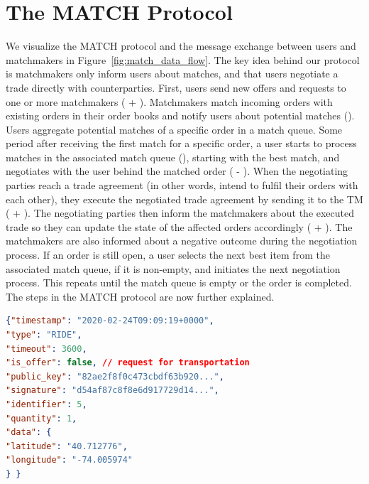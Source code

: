 \section{The MATCH Protocol}
\label{sec:protocol}
We visualize the MATCH protocol and the message exchange between users and matchmakers in Figure~\ref{fig:match_data_flow}.
The key idea behind our protocol is matchmakers only inform users about matches, and that users negotiate a trade directly with counterparties.
First, users send new offers and requests to one or more matchmakers ( + ).
Matchmakers match incoming orders with existing orders in their order books and notify users about potential matches ().
Users aggregate potential matches of a specific order in a match queue.
Some period after receiving the first match for a specific order, a user starts to process matches in the associated match queue (), starting with the best match, and negotiates with the user behind the matched order ( - ).
When the negotiating parties reach a trade agreement (in other words, intend to fulfil their orders with each other), they execute the negotiated trade agreement by sending it to the TM ( + ).
The negotiating parties then inform the matchmakers about the executed trade so they can update the state of the affected orders accordingly ( + ).
The matchmakers are also informed about a negative outcome during the negotiation process.
If an order is still open, a user selects the next best item from the associated match queue, if it is non-empty, and initiates the next negotiation process.
This repeats until the match queue is empty or the order is completed.
The steps in the MATCH protocol are now further explained.

\begin{lstlisting}[language=json,firstnumber=1,float=b,caption=An order in a ride-hailing market (in JSON format).,label=lst:order_example]
{"timestamp": "2020-02-24T09:09:19+0000",
"type": "RIDE",
"timeout": 3600,
"is_offer": false, // request for transportation
"public_key": "82ae2f8f0c473cbdf63b920...",
"signature": "d54af87c8f8e6d917729d14...",
"identifier": 5,
"quantity": 1,
"data": {
"latitude": "40.712776",
"longitude": "-74.005974"
} }
\end{lstlisting}


